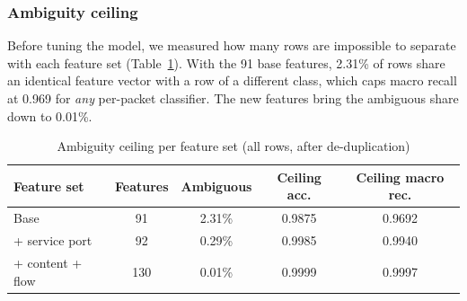 \subsubsection{Ambiguity ceiling}
Before tuning the model, we measured how many rows are impossible to separate with each feature set (Table~\ref{tab:ceiling}). With the 91 base features, 2.31\% of rows share an identical feature vector with a row of a different class, which caps macro recall at 0.969 for \emph{any} per-packet classifier. The new features bring the ambiguous share down to 0.01\%.
\begin{table}[H]
\centering
\renewcommand{\arraystretch}{1.2}
\begin{tabular}{|l|c|c|c|c|}
\hline
\textbf{Feature set} & \textbf{Features} & \textbf{Ambiguous} & \textbf{Ceiling acc.} & \textbf{Ceiling macro rec.} \\ \hline
Base & 91 & 2.31\% & 0.9875 & 0.9692 \\ \hline
+ service port & 92 & 0.29\% & 0.9985 & 0.9940 \\ \hline
+ content + flow & 130 & 0.01\% & 0.9999 & 0.9997 \\ \hline
\end{tabular}
\caption{Ambiguity ceiling per feature set (all rows, after de-duplication)}
\label{tab:ceiling}
\end{table}

